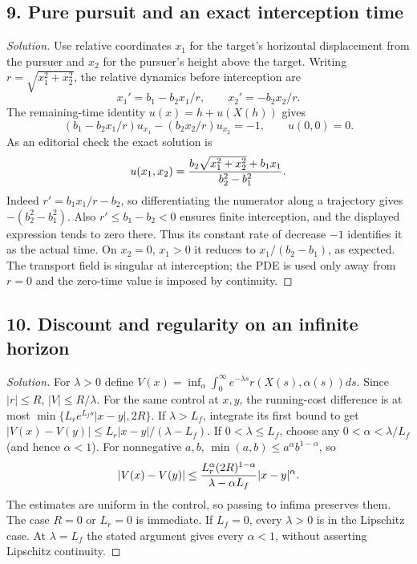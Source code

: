 \subsection*{9. Pure pursuit and an exact interception time}
\begin{proof}[Solution]
Use relative coordinates $x_1$ for the target's horizontal displacement
from the pursuer and $x_2$ for the pursuer's height above the target.
Writing $r=\sqrt{x_1^2+x_2^2}$, the relative dynamics before interception are
\[
 x_1'=b_1-b_2x_1/r,\qquad x_2'=-b_2x_2/r.
\]
The remaining-time identity $u(x)=h+u(X(h))$ gives
\[
 (b_1-b_2x_1/r)u_{x_1}-(b_2x_2/r)u_{x_2}=-1,\qquad u(0,0)=0.
\]
As an editorial check the exact solution is
\[
 u(x_1,x_2)={b_2\sqrt{x_1^2+x_2^2}+b_1x_1\over b_2^2-b_1^2}.
\]
Indeed $r'=b_1x_1/r-b_2$, so differentiating the numerator along a
trajectory gives $-(b_2^2-b_1^2)$. Also $r'\leq b_1-b_2<0$ ensures
finite interception, and the displayed expression tends to zero there.
Thus its constant rate of decrease $-1$ identifies it as the actual time.
On $x_2=0$, $x_1>0$ it reduces to $x_1/(b_2-b_1)$, as expected.
The transport field is singular at interception; the PDE is used only
away from $r=0$ and the zero-time value is imposed by continuity.
\end{proof}

\subsection*{10. Discount and regularity on an infinite horizon}
\begin{proof}[Solution]
For $\lambda>0$ define
$V(x)=\inf_\alpha\int_0^\infty e^{-\lambda s}r(X(s),\alpha(s))ds$.
Since $|r|\leq R$, $|V|\leq R/\lambda$. For the same control at $x,y$,
the running-cost difference is at most
$\min\{L_re^{L_fs}|x-y|,2R\}$. If $\lambda>L_f$, integrate its first
bound to get
$|V(x)-V(y)|\leq L_r|x-y|/(\lambda-L_f)$.
If $0<\lambda\leq L_f$, choose any $0<\alpha<\lambda/L_f$
(and hence $\alpha<1$). For nonnegative $a,b$,
$\min(a,b)\leq a^\alpha b^{1-\alpha}$, so
\[
 |V(x)-V(y)|\leq
 {L_r^\alpha(2R)^{1-\alpha}\over\lambda-\alpha L_f}|x-y|^\alpha.
\]
The estimates are uniform in the control, so passing to infima preserves
them. The case $R=0$ or $L_r=0$ is immediate. If $L_f=0$, every
$\lambda>0$ is in the Lipschitz case. At $\lambda=L_f$ the stated
argument gives every $\alpha<1$, without asserting Lipschitz continuity.
\end{proof}

